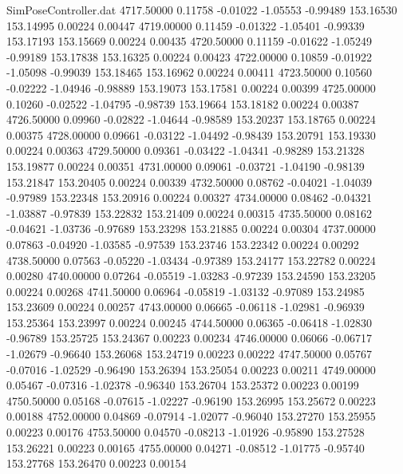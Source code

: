 \begin{filecontents}{SimPoseController.dat}
4717.50000    0.11758   -0.01022    -1.05553   -0.99489  153.16530  153.14995    0.00224    0.00447
4719.00000    0.11459   -0.01322    -1.05401   -0.99339  153.17193  153.15669    0.00224    0.00435
4720.50000    0.11159   -0.01622    -1.05249   -0.99189  153.17838  153.16325    0.00224    0.00423
4722.00000    0.10859   -0.01922    -1.05098   -0.99039  153.18465  153.16962    0.00224    0.00411
4723.50000    0.10560   -0.02222    -1.04946   -0.98889  153.19073  153.17581    0.00224    0.00399
4725.00000    0.10260   -0.02522    -1.04795   -0.98739  153.19664  153.18182    0.00224    0.00387
4726.50000    0.09960   -0.02822    -1.04644   -0.98589  153.20237  153.18765    0.00224    0.00375
4728.00000    0.09661   -0.03122    -1.04492   -0.98439  153.20791  153.19330    0.00224    0.00363
4729.50000    0.09361   -0.03422    -1.04341   -0.98289  153.21328  153.19877    0.00224    0.00351
4731.00000    0.09061   -0.03721    -1.04190   -0.98139  153.21847  153.20405    0.00224    0.00339
4732.50000    0.08762   -0.04021    -1.04039   -0.97989  153.22348  153.20916    0.00224    0.00327
4734.00000    0.08462   -0.04321    -1.03887   -0.97839  153.22832  153.21409    0.00224    0.00315
4735.50000    0.08162   -0.04621    -1.03736   -0.97689  153.23298  153.21885    0.00224    0.00304
4737.00000    0.07863   -0.04920    -1.03585   -0.97539  153.23746  153.22342    0.00224    0.00292
4738.50000    0.07563   -0.05220    -1.03434   -0.97389  153.24177  153.22782    0.00224    0.00280
4740.00000    0.07264   -0.05519    -1.03283   -0.97239  153.24590  153.23205    0.00224    0.00268
4741.50000    0.06964   -0.05819    -1.03132   -0.97089  153.24985  153.23609    0.00224    0.00257
4743.00000    0.06665   -0.06118    -1.02981   -0.96939  153.25364  153.23997    0.00224    0.00245
4744.50000    0.06365   -0.06418    -1.02830   -0.96789  153.25725  153.24367    0.00223    0.00234
4746.00000    0.06066   -0.06717    -1.02679   -0.96640  153.26068  153.24719    0.00223    0.00222
4747.50000    0.05767   -0.07016    -1.02529   -0.96490  153.26394  153.25054    0.00223    0.00211
4749.00000    0.05467   -0.07316    -1.02378   -0.96340  153.26704  153.25372    0.00223    0.00199
4750.50000    0.05168   -0.07615    -1.02227   -0.96190  153.26995  153.25672    0.00223    0.00188
4752.00000    0.04869   -0.07914    -1.02077   -0.96040  153.27270  153.25955    0.00223    0.00176
4753.50000    0.04570   -0.08213    -1.01926   -0.95890  153.27528  153.26221    0.00223    0.00165
4755.00000    0.04271   -0.08512    -1.01775   -0.95740  153.27768  153.26470    0.00223    0.00154

\end{filecontents}
